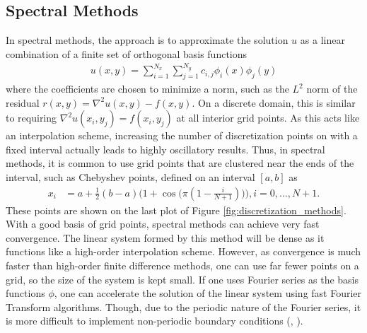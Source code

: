 \subsection{Spectral Methods}

In spectral methods, the approach is to approximate the solution $u$ as a linear combination of a finite set of orthogonal basis functions
\begin{align}
    u(x,y) = \sum_{i=1}^{N_x} \sum_{j=1}^{N_y} c_{i,j} \phi_{i}(x) \phi_{j}(y)
\end{align}
where the coefficients are chosen to minimize a norm, such as the $L^2$ norm of the residual $r(x,y) = \nabla^2 u(x,y) - f(x,y)$. On a discrete domain, this is similar to requiring $\nabla^2 u(x_i, y_j) = f(x_i, y_j)$ at all interior grid points. As this acts like an interpolation scheme, increasing the number of discretization points on with a fixed interval actually leads to highly oscillatory results. Thus, in spectral methods, it is common to use grid points that are clustered near the ends of the interval, such as Chebyshev points, defined on an interval $[a,b]$ as
\begin{align}
    x_i &= a + \frac{1}{2}(b - a)\Big(1 + \cos \big( \pi (1 - \frac{i}{N + 1}) \big) \Big), i = 0, ..., N + 1.
\end{align}
These points are shown on the last plot of Figure \ref{fig:discretization_methods}. With a good basis of grid points, spectral methods can achieve very fast convergence. The linear system formed by this method will be dense as it functions like a high-order interpolation scheme. However, as convergence is much faster than high-order finite difference methods, one can use far fewer points on a grid, so the size of the system is kept small. If one uses Fourier series as the basis functions $\phi$, one can accelerate the solution of the linear system using fast Fourier Transform algorithms. Though, due to the periodic nature of the Fourier series, it is more difficult to implement non-periodic boundary conditions (\cite{leveque2007finite}, \cite{townsend2015automatic}).

